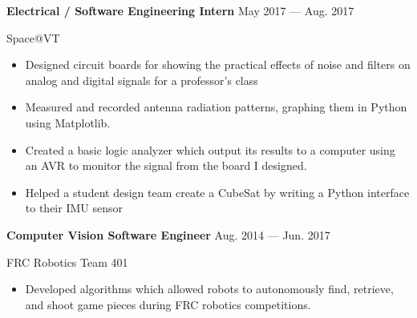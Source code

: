 \parbox[t][][t]{\linewidth}{
	\parbox{\linewidth}{\textbf{Electrical / Software Engineering Intern}
		\hfill {{May 2017 --- Aug. 2017}}}
	\smallbreak
	\parbox{\linewidth}{Space@VT}
	
	\bigskip
	\begin{itemize}
		\item{Designed circuit boards for showing the practical effects of noise and filters on analog and digital signals for a professor's class}\\[-.6em]
		
		\item{Measured and recorded antenna radiation patterns, graphing them in Python using Matplotlib.}\\[-.6em]
		
		\item{Created a basic logic analyzer which output its results to a computer using an AVR to monitor the signal from the board I designed.}\\[-.6em]
		
		\item{Helped a student design team create a CubeSat by writing a Python interface to their IMU sensor}
		
	\end{itemize}
	\bigskip
	\bigskip
}

\parbox[t][][t]{\linewidth}{
	\parbox{\linewidth}{\textbf{Computer Vision Software Engineer}
		\hfill {{Aug. 2014 --- Jun. 2017}}}
	\smallbreak
	\parbox{\linewidth}{FRC Robotics Team 401}
	
	\bigskip
		\begin{itemize}
	\item{Developed algorithms which allowed robots to autonomously find, retrieve, and shoot game pieces during FRC robotics competitions.}
		\end{itemize}
}
